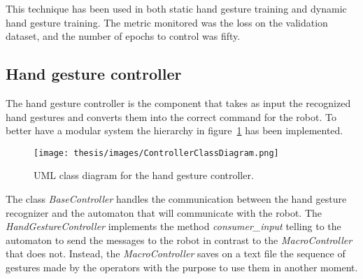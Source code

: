 \documentclass[../thesis.tex]{subfiles}
\begin{document}
This technique has been used in both static hand gesture training and dynamic hand gesture training. The metric monitored was the loss on the validation dataset, and the number of epochs to control was fifty.

\subsection{Hand gesture controller}\label{ss:hand_gesture_controller}
The hand gesture controller is the component that takes as input the recognized hand gestures and converts them into the correct command for the robot. To better have a modular system the hierarchy in figure~\ref{fig:controller-class-diagram} has been implemented.

\begin{figure}[H]
    \centering
    \texttt{[image: thesis/images/ControllerClassDiagram.png]}
    \caption{UML class diagram for the hand gesture controller.}
    \label{fig:controller-class-diagram}
\end{figure}

The class \textit{BaseController} handles the communication between the hand gesture recognizer and the automaton that will communicate with the robot. The \textit{HandGestureController} implements the method \textit{consumer\_input} telling to the automaton to send the messages to the robot in contrast to the \textit{MacroController} that does not. Instead, the \textit{MacroController} saves on a text file the sequence of gestures made by the operators with the purpose to use them in another moment.
\end{document}
